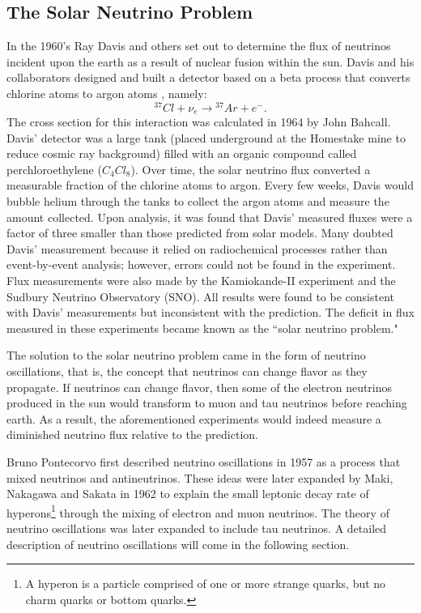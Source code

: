 \subsection{The Solar Neutrino Problem}

In the 1960's Ray Davis and others set out to determine the flux of neutrinos incident upon the earth as a result of nuclear fusion within the sun.  Davis and his collaborators designed and built a detector based on a beta process  that converts chlorine atoms to argon atoms , namely: 
\begin{equation}\label{nuChlorCap}
{}^{37}Cl + \nu_e  \rightarrow {}^{37}Ar + e^-. 
\end{equation}
The cross section for this interaction was calculated in 1964 by John Bahcall.\cite{bahcall}  Davis' detector was a large tank (placed underground at the Homestake mine to reduce cosmic ray background) filled with an organic compound called perchloroethylene ($C_4Cl_8$).  \cite{davis}  Over time, the solar neutrino flux converted a measurable fraction of the chlorine atoms to argon.  Every few weeks, Davis would bubble helium through the tanks to collect the argon atoms and measure the amount collected.  Upon analysis, it was found that Davis' measured fluxes were a factor of three smaller than those predicted from solar models.  Many doubted Davis' measurement because it relied on radiochemical processes rather than event-by-event analysis; however, errors could not be found in the experiment.  Flux measurements were also made by the Kamiokande-II experiment and the Sudbury Neutrino Observatory (SNO).\cite{kamiokande, sno}  All results were found to be consistent with Davis' measurements but inconsistent with the prediction.  The deficit in flux measured in these experiments became known as the ``solar neutrino problem."

The solution to the solar neutrino problem came in the form of neutrino oscillations, that is, the concept that neutrinos can change flavor as they propagate.  If neutrinos can change flavor, then some of the electron neutrinos produced in the sun would transform to muon and tau neutrinos before reaching earth.  As a result, the aforementioned experiments would indeed measure a diminished neutrino flux relative to the prediction.  

Bruno Pontecorvo first described neutrino oscillations in 1957 as a process that mixed neutrinos and antineutrinos.\cite{pontecorvo}  These ideas were later expanded by Maki, Nakagawa and Sakata in 1962 to explain the small leptonic decay rate of hyperons\footnote{A hyperon is a particle comprised of one or more strange quarks, but no charm quarks or bottom quarks.} through the mixing of electron and muon neutrinos.  The theory of neutrino oscillations was later expanded to include tau neutrinos.  A detailed description of neutrino oscillations will come in the following section.

